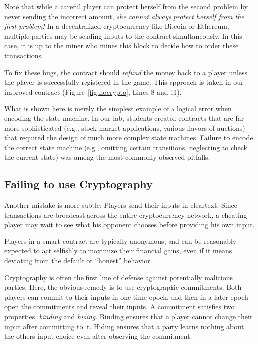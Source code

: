 \documentclass[10pt,twocolumn,letterpaper]{article}
\newcommand{\elaine}[1]{}
\begin{document}
Note that while a careful player 
can protect herself from the second problem by never sending the incorrect amount,
{\it she cannot always protect 
herself from the first problem!}
In a decentralized cryptocurrency
like Bitcoin or Ethereum, 
multiple parties may be sending inputs 
to the contract simultaneously.
In this case, it is up to the miner who mines this block
to decide how to order these transactions.

To fix these bugs, the contract
should \emph{refund} the money back to
a player unless the player is successfully registered in the game.
This approach is taken in our improved contract (Figure~\ref{fig:nocrypto}, Lines 8 and 11).


What is shown here is merely the simplest example 
of a logical error when encoding the state machine.
In our lab, students created contracts that are far more
sophisticated (e.g., stock market 
applications, various flavors of auctions)
that required the design of much more 
complex state machines.
Failure to encode the correct state machine (e.g., 
omitting certain transitions, neglecting
to check the current state)  
was among the most commonly observed pitfalls. 


\subsection{Failing to use Cryptography}
Another mistake is more subtle:
Players
send their inputs in cleartext. Since transactions are broadcast across the entire cryptocurrency network, a cheating player may wait to see what his opponent chooses before providing his own input.

Players in a smart contract are typically anonymous, and can be reasonably expected to act selfishly to maximize their financial gains, even if it means deviating from the default or ``honest'' behavior.

Cryptography is often the first line of defense against potentially malicious parties. 
Here, the obvious remedy is to use
cryptographic commitments.
Both players can commit to their inputs in one time epoch,
and then in a later epoch open the commitments and reveal their inputs.
A commitment satisfies two properties, {\it binding} and {\it hiding}.
Binding ensures that a player cannot change their input
after committing to it. Hiding ensures
that a party learns nothing about the others input choice even after observing the commitment.
\end{document}
